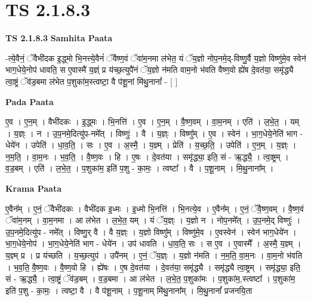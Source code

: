 \documentclass[17pt]{extarticle}
\begin{document}
\section*{ TS 2.1.8.3 }

\textbf{TS 2.1.8.3 } \newline
\textbf{Samhita Paata} \newline

-त्ये॒वैनं॒ ॅवैभी॑दक इ॒द्ध्मो भि॒नत्त्ये॒वैनं॑ ॅवैष्ण॒वं ॅवा॑म॒नमा ल॑भेत॒ यं ॅय॒ज्ञो नोप॒नमे॒द्-विष्णु॒र्वै य॒ज्ञो विष्णु॑मे॒व स्वेन॑ भाग॒धेये॒नोप॑ धावति॒ स ए॒वास्मै॑ य॒ज्ञ्ं प्र य॑च्छ॒त्युपै॑नं ॅय॒ज्ञो न॑मति वाम॒नो भ॑वति वैष्ण॒वो ह्ये॑ष दे॒वत॑या॒ समृ॑द्ध्यै त्वा॒ष्ट्रं ॅव॑ड॒बमा ल॑भेत प॒शुका॑म॒स्त्वष्टा॒ वै प॑शू॒नां मि॑थु॒नानां᳚ - [  ] \newline

\textbf{Pada Paata} \newline

ए॒व । ए॒न॒म् । वैभी॑दकः । इ॒द्ध्मः । भि॒नत्ति॑ । ए॒व । ए॒न॒म् । वै॒ष्ण॒वम् । वा॒म॒नम् । एति॑ । ल॒भे॒त॒ । यम् । य॒ज्ञ्ः । न । उ॒प॒नमे॒दित्यु॑प-नमे᳚त् । विष्णुः॑ । वै । य॒ज्ञ्ः । विष्णु᳚म् । ए॒व । स्वेन॑ । भा॒ग॒धेये॒नेति॑ भाग - धेये॑न । उपेति॑ । धा॒व॒ति॒ । सः । ए॒व । अ॒स्मै॒ । य॒ज्ञ्म् । प्रेति॑ । य॒च्छ॒ति॒ । उपेति॑ । ए॒न॒म् । य॒ज्ञ्ः । न॒म॒ति॒ । वा॒म॒नः । भ॒व॒ति॒ । वै॒ष्ण॒वः । हि । ए॒षः । दे॒वत॑या । समृ॑द्ध्या॒ इति॒ सं - ऋ॒द्ध्यै॒ । त्वा॒ष्ट्रम् । व॒ड॒बम् । एति॑ । ल॒भे॒त॒ । प॒शुका॑म॒ इति॑ प॒शु - का॒मः॒ । त्वष्टा᳚ । वै । प॒शू॒नाम् । मि॒थु॒नाना᳚म् ।  \newline


\textbf{Krama Paata} \newline

ए॒वैन᳚म् । ए॒नं॒ ॅवैभी॑दकः । वैभी॑दक इ॒ध्मः । इ॒ध्मो भि॒नत्ति॑ । भि॒नत्ये॒व । ए॒वैन᳚म् । ए॒नं॒ ॅवै॒ष्ण॒वम् । वै॒ष्ण॒वं ॅवा॑म॒नम् । वा॒म॒नमा । आ ल॑भेत । ल॒भे॒त॒ यम् । यं ॅय॒ज्ञ्ः । य॒ज्ञो न । नोप॒नमे᳚त् । उ॒प॒नमे॒द् विष्णुः॑ । उ॒प॒नमे॒दित्यु॑प - नमे᳚त् । विष्णु॒र् वै । वै य॒ज्ञ्ः । य॒ज्ञो विष्णु᳚म् । विष्णु॑मे॒व । ए॒वस्वेन॑ । स्वेन॑ भाग॒धेये॑न । भा॒ग॒धेये॒नोप॑ । भा॒ग॒धेये॒नेति॑ भाग - धेये॑न । उप॑ धावति । धा॒व॒ति॒ सः । स ए॒व । ए॒वास्मै᳚ । अ॒स्मै॒ य॒ज्ञ्म् । य॒ज्ञ्म् प्र । प्र य॑च्छति । य॒च्छ॒त्युप॑ । उपै॑नम् । ए॒नं॒ ॅय॒ज्ञ्ः । य॒ज्ञो न॑मति । न॒म॒ति॒ वा॒म॒नः । वा॒म॒नो भ॑वति । भ॒व॒ति॒ वै॒ष्ण॒वः । वै॒ष्ण॒वो हि । ह्ये॑षः । ए॒ष दे॒वत॑या । दे॒वत॑या॒ समृ॑द्ध्यै । समृ॑द्ध्यै त्वा॒ष्ट्रम् । समृ॑द्ध्या॒ इति॒ सं - ऋ॒द्ध्यै॒ । त्वा॒ष्ट्रं ॅव॑ड॒बम् । व॒ड॒बमा । आ ल॑भेत । ल॒भे॒त॒ प॒शुका॑मः । प॒शुका॑म॒,स्त्वष्टा᳚ । प॒शुका॑म॒ इति॑ प॒शु - का॒मः॒ । त्वष्टा॒ वै । वै प॑शू॒नाम् । प॒शू॒नाम् मि॑थु॒नाना᳚म् । मि॒थु॒नानां᳚ प्रजनयि॒ता \newline
\end{document}

